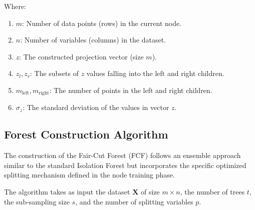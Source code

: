 Where:
\begin{enumerate}
    \item $m$: Number of data points (rows) in the current node.
    \item $n$: Number of variables (columns) in the dataset.
    \item $z$: The constructed projection vector (size $m$).
    \item $z_l, z_r$: The subsets of $z$ values falling into the left and right children.
    \item $m_{\text{left}}, m_{\text{right}}$: The number of points in the left and right children.
    \item $\sigma_{z}$: The standard deviation of the values in vector $z$.
\end{enumerate}

\subsection{Forest Construction Algorithm}
\label{forestConstruction}
The construction of the Fair-Cut Forest (FCF) follows an ensemble approach similar to the standard Isolation Forest but incorporates the specific optimized splitting mechanism defined in the node training phase.

The algorithm takes as input the dataset $\mathbf{X}$ of size $m \times n$, the number of trees $t$, the sub-sampling size $s$, and the number of splitting variables $p$.

